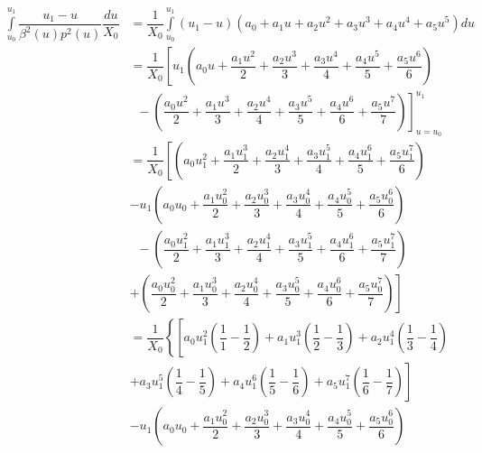 \documentclass{article}
\begin{document}
\begin{align*}
    \int\limits_{u_0}^{u_1} \dfrac{u_1-u}{\beta^2(u) p^2(u)}\dfrac{du}{X_0} &= \dfrac{1}{X_0}\int\limits_{u_0}^{u_1}\left(u_1-u\right)\left(a_0 +a_1u + a_2u^2+a_3u^3+a_4u^4+a_5u^5\right)du\\
    &= \dfrac{1}{X_0}
    \left[
        u_1
        \left(
            a_0u + \dfrac{a_1u^2}{2} + \dfrac{a_2u^3}{3} + \dfrac{a_3u^4}{4} + \dfrac{a_4u^5}{5} + \dfrac{a_5u^6}{6}
        \right)
    \right.
    \\
    &
    \left.
        \;\; -
        \left(
            \dfrac{a_0u^2}{2} + \dfrac{a_1u^3}{3} + \dfrac{a_2u^4}{4} + \dfrac{a_3u^5}{5} + \dfrac{a_4u^6}{6} + \dfrac{a_5u^7}{7}
        \right)
    \right]_{u=u_0}^{u_1}
    \\
    &= \dfrac{1}{X_0}
    \left[
        \left(
            a_0u_1^2 + \dfrac{a_1u_1^3}{2} + \dfrac{a_2u_1^4}{3} + \dfrac{a_3u_1^5}{4} + \dfrac{a_4u_1^6}{5} + \dfrac{a_5u_1^7}{6}
        \right)
    \right.
    \\
    &
        -
        u_1
        \left(
            a_0u_0 + \dfrac{a_1u_0^2}{2} + \dfrac{a_2u_0^3}{3} + \dfrac{a_3u_0^4}{4} + \dfrac{a_4u_0^5}{5} + \dfrac{a_5u_0^6}{6}
        \right)
    \\
    &\;\;
        -
        \left(
            \dfrac{a_0u_1^2}{2} + \dfrac{a_1u_1^3}{3} + \dfrac{a_2u_1^4}{4} + \dfrac{a_3u_1^5}{5} + \dfrac{a_4u_1^6}{6} + \dfrac{a_5u_1^7}{7}
        \right)
    \\
    &
    \left.
    +
        \left(
            \dfrac{a_0u_0^2}{2} + \dfrac{a_1u_0^3}{3} + \dfrac{a_2u_0^4}{4} + \dfrac{a_3u_0^5}{5} + \dfrac{a_4u_0^6}{6} + \dfrac{a_5u_0^7}{7}
        \right)
    \right]
    \\
    &= \dfrac{1}{X_0}
    \left\{
        \left[
              a_0u_1^2\left(\dfrac{1}{1}- \dfrac{1}{2}\right)
            + a_1u_1^3\left(\dfrac{1}{2} - \dfrac{1}{3}\right)
            + a_2u_1^4\left(\dfrac{1}{3} - \dfrac{1}{4}\right)
        \right.
    \right.
        \\
        &
        \left.
            + a_3u_1^5\left(\dfrac{1}{4} - \dfrac{1}{5}\right)
            + a_4u_1^6\left(\dfrac{1}{5} - \dfrac{1}{6}\right)
            + a_5u_1^7\left(\dfrac{1}{6} - \dfrac{1}{7}\right)
        \right]
    \\
    &
        -
        u_1
        \left(
            a_0u_0 + \dfrac{a_1u_0^2}{2} + \dfrac{a_2u_0^3}{3} + \dfrac{a_3u_0^4}{4} + \dfrac{a_4u_0^5}{5} + \dfrac{a_5u_0^6}{6}
        \right)
    \\

\end{align*}
\end{document}
